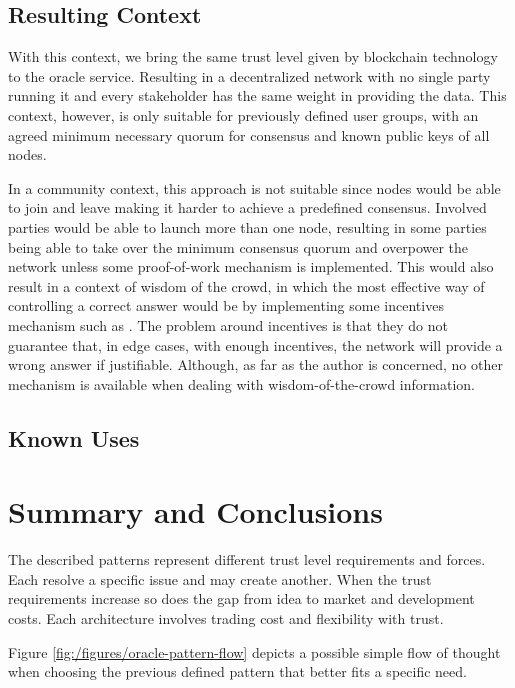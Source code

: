 \subsection{Resulting Context}
With this context, we bring the same trust level given by blockchain technology to the oracle service. Resulting in a decentralized network with no single party running it and every stakeholder has the same weight in providing the data. This context, however, is only suitable for previously defined user groups, with an agreed minimum necessary quorum for consensus and known public keys of all nodes.

In a community context, this approach is not suitable since nodes would be able to join and leave making it harder to achieve a predefined consensus. Involved parties would be able to launch more than one node, resulting in some parties being able to take over the minimum consensus quorum and overpower the network unless some proof-of-work mechanism is implemented. This would also result in a context of wisdom of the crowd, in which the most effective way of controlling a correct answer would be by implementing some incentives mechanism such as \cite{Adler2018a}. The problem around incentives is that they do not guarantee that, in edge cases, with enough incentives, the network will provide a wrong answer if justifiable. Although, as far as the author is concerned, no other mechanism is available when dealing with wisdom-of-the-crowd information.



\subsection{Known Uses}


\section{Summary and Conclusions}
The described patterns represent different trust level requirements and forces. Each resolve a specific issue and may create another. When the trust requirements increase so does the gap from idea to market and development costs. Each architecture involves trading cost and flexibility with trust.

Figure \ref{fig:/figures/oracle-pattern-flow} depicts a possible simple flow of thought when choosing the previous defined pattern that better fits a specific need.

